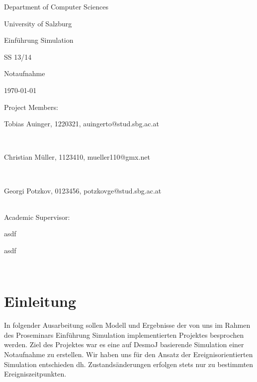 \documentclass[12pt,fleqn,a4paper]{article}
\begin{document}
\begin{titlepage}%
\vspace{2cm}
\centerline{
\large{Department of Computer Sciences}}
\vspace{0.2cm}
\centerline{\large{University of Salzburg}}%
\vspace{2cm}

\centerline{\large{Einf\"{u}hrung Simulation}}
\centerline{SS 13/14}
\vspace{1cm}

\centerline{\huge{Notaufnahme}}
\vspace{1cm}

\vspace{0.4cm}%
\centerline{\today}
\vspace{5cm}%

\vspace{0.2cm}
Project Members:\\
\centerline{Tobias Auinger, 1220321, auingerto@stud.sbg.ac.at}\\
\centerline{Christian M\"{u}ller, 1123410, mueller110@gmx.net}\\
\centerline{Georgi Potzkov, 0123456, potzkovge@stud.sbg.ac.at}
\vspace {0.8cm}\\

Academic Supervisor: \\
\centerline{asdf}
\centerline{asdf}
\vspace{0.8cm}\\
\clearpage
\end{titlepage}


\clearpage
\pagestyle{headings}
\setcounter{page}{1}
\setcounter{page}{1}

\tableofcontents
\newpage

\section{Einleitung}
In folgender Ausarbeitung sollen  Modell und Ergebnisse der von uns im Rahmen des Proseminars Einf\"{u}hrung Simulation implementierten Projektes besprochen werden.
Ziel des Projektes war es eine auf DesmoJ basierende Simulation einer Notaufnahme zu erstellen. Wir haben uns f\"{u}r den Ansatz der Ereignisorientierten Simulation entschieden dh. Zustands\"{a}nderungen erfolgen stets nur zu bestimmten Ereigniszeitpunkten.
\end{document}
